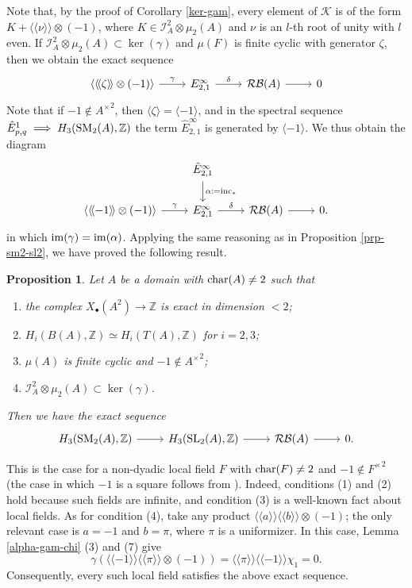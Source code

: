 \documentclass[11pt]{amsart}
\theoremstyle{definition}
\theoremstyle{plain}
\newtheorem{prp}[ntn]{Proposition}
\theoremstyle{definition}
\numberwithin{equation}{section}
\newcommand{\z}{\mathbb{Z}}
\newcommand{\II}{\mathcal{I}}
\newcommand{\RB}{\mathcal{RB}}
\renewcommand{\aa}{{A^\times}}
\newcommand{\lan}{\langle}
\newcommand{\ran}{\rangle}
\newcommand{\Lan}{\langle \! \langle}
\newcommand{\Ran}{\rangle \! \rangle}
\newcommand{\SL}{\mathit{{\rm SL}}}
\newcommand{\SM}{\mathit{{\rm SM}}}
\newcommand{\im}{{\rm im}}
\newcommand{\inc}{{\rm inc}}
\renewcommand{\char}{{\rm char}}
\begin{document}
	Note that, by the proof of Corollary \ref{ker-gam}, every element of $\mathcal{K}$ is of the form $K+\Lan\nu\Ran\otimes(-1)$, where $K\in\II^2_A\otimes\mu_2(A)$ and $\nu$ is an $l$-th root of unity with $l$ even. If $\II^2_A\otimes\mu_2(A)\subset\ker(\gamma)$ and $\mu(F)$ is finite cyclic with generator $\zeta$, then we obtain the exact sequence
	\[
	\begin{tikzcd}
		\lan\Lan\zeta\Ran\otimes(-1)\ran\ar[r,"\gamma"] & E^{\infty}_{2,1}\ar[r,"\delta"] & \RB(A)\ar[r] & 0
	\end{tikzcd}
	\]
	Note that if $-1\notin\aa^2$, then $\lan\zeta\ran=\lan-1\ran$, and in the spectral sequence $\hat{E}^1_{p,q}\implies H_3(\SM_2(A),\z)$ the term $\hat{E}^{\infty}_{2,1}$ is generated by $\lan-1\ran$. We thus obtain the diagram
	\begin{equation}
		\begin{tikzcd}
			& \hat{E}^{\infty}_{2,1}\ar[d,"\alpha:=\inc_*"] & &\\
			\lan\Lan-1\Ran\otimes (-1)\ran\ar[r,"\gamma"]& E^{\infty}_{2,1} \ar[r,"\delta"] & \RB(A)\ar[r] & 0.
		\end{tikzcd}
	\end{equation}
	in which $\im(\gamma)=\im(\alpha)$. Applying the same reasoning as in Proposition \ref{prp-sm2-sl2}, we have proved the following result.
	\begin{prp}
		\label{prp-sm2-sl2-local}
		Let $A$ be a domain with $\char(A)\neq2$ such that
		\begin{enumerate}
			\item the complex $X_{\bullet}(A^2)\to\z$ is exact in dimension $<2$;
			\item $H_i(B(A),\z)\simeq H_i(T(A),\z)$ for $i=2,3$;
			\item $\mu(A)$ is finite cyclic and $-1\notin\aa^2$;
			\item $\II^2_{A}\otimes\mu_2(A)\subset\ker(\gamma)$.
		\end{enumerate}
		Then we have the exact sequence
		\[
		\begin{tikzcd}
			H_3(\SM_2(A),\z)\ar[r] & H_3(\SL_2(A),\z)\ar[r] & \RB(A) \ar[r] & 0.
		\end{tikzcd}
		\]
	\end{prp}
	This is the case for a non-dyadic local field $F$ with $\char(F)\neq 2$ and $-1\notin {F^{\times}}^2$ (the case in which $-1$ is a square follows from \cite[Corollary 6.4]{B-E--2023}). Indeed, conditions (1) and (2) hold because such fields are infinite, and condition (3) is a well-known fact about local fields. As for condition (4), take any product $\Lan a\Ran\Lan b\Ran\otimes(-1)$; the only relevant case is $a=-1$ and $b=\pi$, where $\pi$ is a uniformizer. In this case, Lemma \ref{alpha-gam-chi} (3) and (7) give
	\[
	\gamma(\Lan -1\Ran\Lan \pi\Ran\otimes(-1))=\Lan \pi\Ran\Lan -1\Ran\chi_1=0.
	\]
	Consequently, every such local field satisfies the above exact sequence.\\
	
\end{document}
